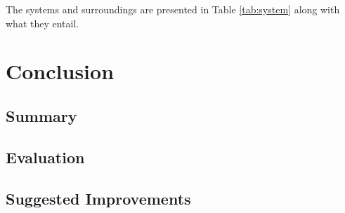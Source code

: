 \documentclass[
	letterpaper, %
	12pt, %
]{CSUniSchoolLabReport}
\begin{document}
The systems and surroundings are presented in Table \ref*{tab:system} along with
what they entail.

\begin{table}
  \centering
  \caption{System and surroundings of the calorimeter.}
  \label{tab:system}
\end{table}

\section{Conclusion}

\subsection{Summary}

\subsection{Evaluation}

\subsection{Suggested Improvements}


\printbibliography %

\end{document}
